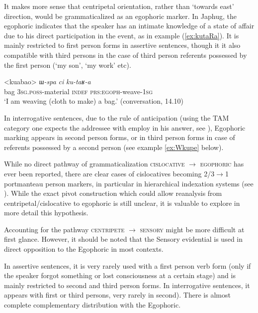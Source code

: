 \documentclass[oneside,a4paper,11pt]{article}
\newcommand{\ipa}[1]{\mbox{\phon\textit{#1}}} %
\begin{document}
It makes more sense that centripetal orientation, rather than `towards east' direction, would be grammaticalized as an egophoric marker. In Japhug, the egophoric indicates that the speaker has an  intimate knowledge of a state of affair due to his direct participation in the event, as in example (\ref{ex:kutaRa}). It is mainly restricted to first person forms in assertive sentences, though it it also compatible with third persons in the case of third person referents possessed by the first person (`my son', `my work' etc). 

\begin{exe}
\ex \label{ex:kutaRa}
\gll 
<kuabao> 	\ipa{ɯ-spa}  	\ipa{ci}  	\ipa{ku-taʁ-a}  \\
bag \textsc{3sg.poss}-material \textsc{indef} \textsc{prs:egoph}-weave-\textsc{1sg} \\
\glt `I am weaving (cloth to make) a bag.' (conversation, 14.10)
\end{exe}

In interrogative sentences, due to the rule of anticipation (using the TAM category one expects the addressee with employ in his answer, see \citealt{tournadre14evidentiality}), Egophoric marking appears in second person forms, or in third person forms in case of referents possessed by a second person (see example \ref{ex:Wkupe} below).

While no direct pathway of grammaticalization \textsc{cislocative} $\rightarrow$ \textsc{egophoric} has ever been reported, there are clear cases of cislocatives becoming 2/3$\rightarrow$1 portmanteau person markers, in particular in hierarchical indexation systems (see \citealt{jacques14inverse}). While the exact pivot construction which could allow reanalysis from centripetal/cislocative to egophoric is still unclear, it is valuable to explore in more detail this hypothesis.

Accounting for the pathway \textsc{centripete} $\rightarrow$ \textsc{sensory} might be more difficult at first glance. However, it should be noted that the Sensory evidential is used in direct opposition to the Egophoric in most contexts. 

In assertive sentences, it is very rarely used with a first person verb form (only if the speaker forgot something or lost consciousness at a certain stage) and is mainly restricted to second and third person forms. In interrogative sentences, it appears with first or third persons, very rarely in second). There is almost complete complementary distribution with the Egophoric. 
 
\end{document}
